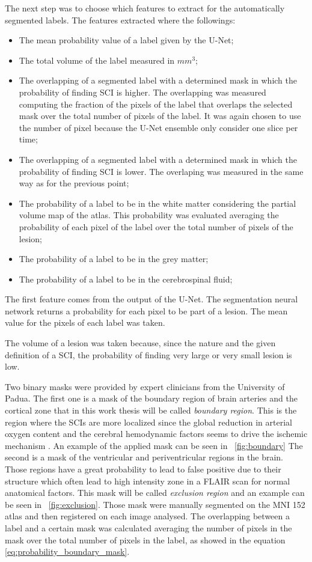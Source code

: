 \documentclass{standalone}
\begin{document}
The next step was to choose which features to extract for the automatically segmented labels.
The features extracted where the followings:
\begin{itemize}
    \item The mean probability value of a label given by the U-Net;
    \item The total volume of the label measured in $mm^3$;
    \item The overlapping of a segmented label with a determined mask in which the probability of finding SCI is higher. The overlapping was measured computing the fraction of the pixels of the label that overlaps the selected mask over the total number of pixels of the label. It was again chosen to use the number of pixel because the U-Net ensemble only consider one slice per time;
    \item The overlapping of a segmented label with a determined mask in which the probability of finding SCI is lower. The overlaping was measured in the same way as for the previous point;
    \item The probability of a label to be in the white matter considering the partial volume map of the atlas. This probability was evaluated averaging the probability of each pixel of the label over the total number of pixels of the lesion;
    \item The probability of a label to be in the grey matter;
    \item The probability of a label to be in the cerebrospinal fluid;
\end{itemize}

The first feature comes from the output of the U-Net. The segmentation neural network returns a probability for each pixel to be part of a lesion. The mean value for the pixels of each label was taken.

The volume of a lesion was taken because, since the nature and the given definition of a SCI, the probability of finding very large or very small lesion is low.

Two binary masks were provided by expert clinicians from the University of Padua.
The first one is a mask of the boundary region of brain arteries and the cortical zone that in this work thesis will be called \textit{boundary region}. This is the region where the SCIs are more localized since the global reduction in arterial oxygen content and the cerebral hemodynamic factors seems to drive the ischemic mechanism \cite{ART:Ford}. An example of the applied mask can be seen in \figureautorefname~\ref{fig:boundary}
The second is a mask of the ventricular and periventricular regions in the brain. Those regions have a great probability to lead to false positive due to their structure which often lead to high intensity zone in a FLAIR scan for normal anatomical factors. This mask will be called \textit{exclusion region} and an example can be seen in \figureautorefname~\ref{fig:exclusion}.
Those mask were manually segmented on the MNI 152 atlas and then registered on each image analysed.
The overlapping between a label and a certain mask was calculated averaging the number of pixels in the mask over the total number of pixels in the label, as showed in the equation \ref{eq:probability_boundary_mask}.
\end{document}
